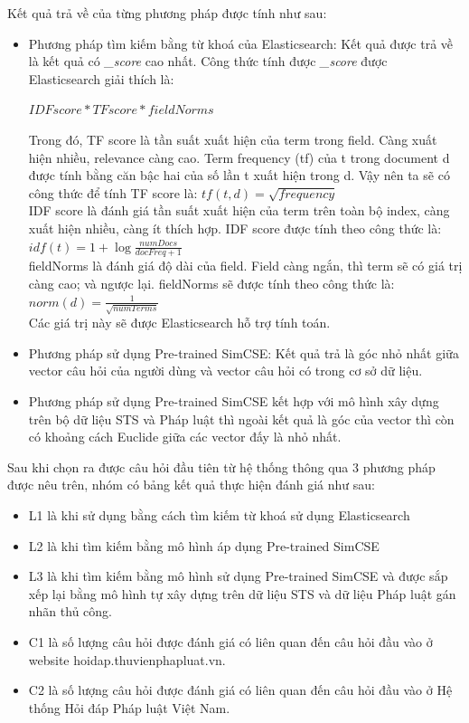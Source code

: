 Kết quả trả về của từng phương pháp được tính như sau:
\begin{itemize}
	\item Phương pháp tìm kiếm bằng từ khoá của Elasticsearch: Kết quả được trả về là kết quả có \textit{\_score} cao nhất. Công thức tính được \textit{\_score} được Elasticsearch giải thích là:
	\begin{center}
	$IDF score * TF score * fieldNorms$\\
	\end{center}

	Trong đó, TF score là tần suất xuất hiện của term trong field. Càng xuất hiện nhiều, relevance càng cao. Term frequency (tf) của t trong document d được tính bằng căn bậc hai của số lần t xuất hiện trong d. Vậy nên ta sẽ có công thức để tính TF score là: $tf(t, d) = \sqrt{frequency}$\\
	IDF score là đánh giá tần suất xuất hiện của term trên toàn bộ index, càng xuất hiện nhiều, càng ít thích hợp. IDF score được tính theo công thức là: $idf(t) = 1 + \log{\frac{numDocs} {docFreq+1}}$\\
	fieldNorms là đánh giá độ dài của field. Field càng ngắn, thì term sẽ có giá trị càng cao; và ngược lại. fieldNorms sẽ được tính theo công thức là: $norm(d) =\frac{1}{\sqrt{numTerms}}$\\
	Các giá trị này sẽ được Elasticsearch hỗ trợ tính toán.
	\item Phương pháp sử dụng Pre-trained SimCSE: Kết quả trả là góc nhỏ nhất giữa vector câu hỏi của người dùng và vector câu hỏi có trong cơ sở dữ liệu.
	\item Phương pháp sử dụng Pre-trained SimCSE kết hợp với mô hình xây dựng trên bộ dữ liệu STS và Pháp luật thì ngoài kết quả là góc của vector thì còn có khoảng cách Euclide giữa các vector đấy là nhỏ nhất.
\end{itemize}

Sau khi chọn ra được câu hỏi đầu tiên từ hệ thống thông qua 3 phương pháp được nêu trên, nhóm có bảng kết quả thực hiện đánh giá như sau:
\begin{itemize}
	\item L1 là khi sử dụng bằng cách tìm kiếm từ khoá sử dụng Elasticsearch 
	\item L2 là khi tìm kiếm bằng mô hình áp dụng Pre-trained SimCSE
	\item L3 là khi tìm kiếm bằng mô hình sử dụng Pre-trained SimCSE và được sắp xếp lại bằng mô hình tự xây dựng trên dữ liệu STS và dữ liệu Pháp luật gán nhãn thủ công.
	\item C1 là số lượng câu hỏi được đánh giá có liên quan đến câu hỏi đầu vào ở website hoidap.thuvienphapluat.vn.
	\item C2 là số lượng câu hỏi được đánh giá có liên quan đến câu hỏi đầu vào ở Hệ thống Hỏi đáp Pháp luật Việt Nam.
	
\end{itemize}

